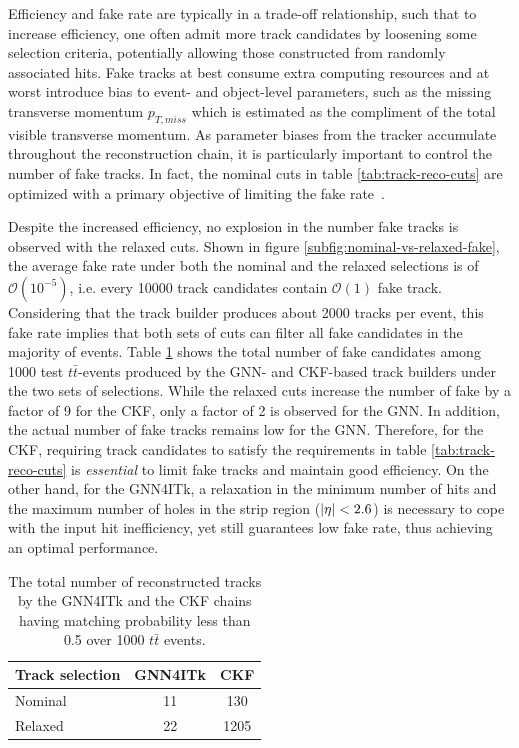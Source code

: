 Efficiency and fake rate are typically in a trade-off relationship, such that to increase efficiency, one often admit more track candidates by loosening some selection criteria, potentially allowing those constructed from randomly associated hits. 
Fake tracks at best consume extra computing resources and at worst introduce bias to event- and object-level parameters, such as the missing transverse momentum $p_{T,miss}$ which is estimated as the compliment of the total visible transverse momentum. 
As parameter biases from the tracker accumulate throughout the reconstruction chain, it is particularly important to control the number of fake tracks.
In fact, the nominal cuts in table \ref{tab:track-reco-cuts} are optimized with a primary objective of limiting the fake rate~\cite{Aad_2025}.

Despite the increased efficiency, no explosion in the number fake tracks is observed with the relaxed cuts. 
Shown in figure \ref{subfig:nominal-vs-relaxed-fake}, the average fake rate under both the nominal and the relaxed selections is of $\mathcal{O}(10^{-5})$, i.e. every 10000 track candidates contain $\mathcal{O}(1)$ fake track.
Considering that the track builder produces about 2000 tracks per event, this fake rate implies that both sets of cuts can filter all fake candidates in the majority of events.
Table \ref{tab:integrated-fake} shows the total number of fake candidates among 1000 test $t\bar{t}$-events produced by the GNN- and CKF-based track builders under the two sets of selections. 
While the relaxed cuts increase the number of fake by a factor of 9 for the CKF, only a factor of 2 is observed for the GNN.
In addition, the actual number of fake tracks remains low for the GNN.
Therefore, for the CKF, requiring track candidates to satisfy the requirements in table \ref{tab:track-reco-cuts} is \textit{essential} to limit fake tracks and maintain good efficiency. 
On the other hand, for the GNN4ITk, a relaxation in the minimum number of hits and the maximum number of holes in the strip region 
($\abs{\eta}<2.6$) is necessary to cope with the input hit inefficiency, yet still guarantees low fake rate, thus achieving an optimal performance.

\begin{table}[h!]
    \centering
    \begin{tabular}{|l|c|c|} \hline
        Track selection & GNN4ITk & CKF \\ \hline
        Nominal & 11 & 130 \\
        Relaxed & 22 & 1205 \\ \hline
    \end{tabular}
    \caption{The total number of reconstructed tracks by the GNN4ITk and the CKF chains having matching probability less than 0.5 over 1000 $t\bar{t}$ events.}
    \label{tab:integrated-fake}
\end{table}

